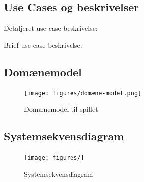 \documentclass[../main.tex]{subfiles}
\begin{document}
\subsection{Use Cases og beskrivelser\textit{}}
\TODO[]
\begin{flushleft}Detaljeret use-case beskrivelse:\end{flushleft}

\begin{flushleft}Brief use-case beskrivelse:\end{flushleft}


\subsection{Domænemodel}
\begin{figure}[H]
    \centering
    \texttt{[image: figures/domæne-model.png]}
    \caption{Domænemodel til spillet}
    \label{fig:domain}
\end{figure}


\subsection{Systemsekvensdiagram}
\TODO[]
\begin{figure}[H]
    \centering
    \texttt{[image: figures/]}
    \caption{Systemsekvensdiagram}
    \label{fig:systemsekvens}
\end{figure}
\end{document}
